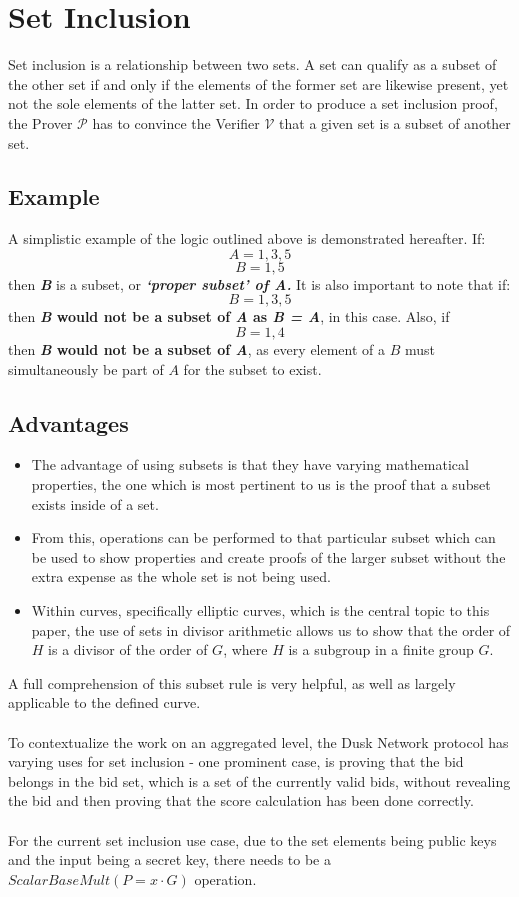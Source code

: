 \documentclass{article}
\begin{document}
\section{Set Inclusion}
Set inclusion is a relationship between two sets. A set can qualify as a subset of the other set if and only if the elements of the former set are likewise present, yet not the sole elements of the latter set. In order to produce a set inclusion proof, the Prover $\mathcal{P}$ has to convince the Verifier $\mathcal{V}$ that a given set is a subset of another set.
\subsection{Example}
A simplistic example of the logic outlined above is demonstrated hereafter. If:  $$ A={1,3,5} $$
$$ B={1,5} $$ then \textbf{\textit{B}} is a subset, or \textbf{\textit{‘proper subset’ of A.}} 
It is also important to note that if: $$ B={1,3,5} $$ then \textbf{\textit{B} would not be a subset of \textit{A} as \textit{B = A}}, in this case. Also, if $$ B={1,4} $$ then \textbf{\textit{B} would not be a subset of \textit{A}}, as every element of a $B$ must simultaneously be part of $A$ for the subset to exist.
\subsection{Advantages}
\begin{itemize}
    \item The advantage of using subsets is that they have varying mathematical properties, the one which is most pertinent to us is the proof that a subset exists inside of a set.
    \item From this, operations can be performed to that particular subset which can be used to show properties and create proofs of the larger subset without the extra expense as the whole set is not being used.
    \item Within curves, specifically elliptic curves, which is the central topic to this paper, the use of sets in divisor arithmetic allows us to show that the order of $H$ is a divisor of the order of $G$, where $H$ is a subgroup in a finite group $G$.
\end{itemize}
A full comprehension of this subset rule is very helpful, as well as largely applicable to the defined curve. \\\\
To contextualize the work on an aggregated level, the Dusk Network protocol has varying uses for set inclusion -  one prominent case, is proving that the bid belongs in the bid set, which is a set of the currently valid bids, without revealing the bid and then proving that the score calculation has been done correctly. \\\\
For the current set inclusion use case, due to the set elements being public keys and the input being a secret key, there needs to be a $ScalarBaseMult (P=x\cdot G)$ operation.
\end{document}
